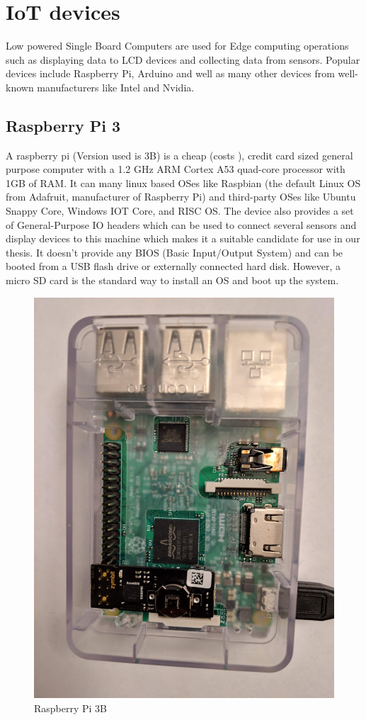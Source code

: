 \documentclass[11pt,openright]{report}
\begin{document}
\section{IoT devices}
Low powered Single Board Computers are used for Edge computing operations such as displaying data to LCD devices and collecting data from sensors. Popular devices include Raspberry Pi, Arduino and well as many other devices from well-known manufacturers like Intel and Nvidia.

\subsection{Raspberry Pi 3}
A raspberry pi (Version used is 3B) is a cheap (costs ), credit card sized general purpose computer with a 1.2 GHz ARM Cortex A53 quad-core processor with 1GB of RAM. It can many linux based OSes like Raspbian (the default Linux OS from Adafruit, manufacturer of Raspberry Pi) and third-party OSes like Ubuntu Snappy Core, Windows IOT Core, and RISC OS. The device also provides a set of General-Purpose IO headers which can be used to connect several sensors and display devices to this machine which makes it a suitable candidate for use in our thesis. It doesn't provide any BIOS (Basic Input/Output System) and can be booted from a USB flash drive or externally connected hard disk. However, a micro SD card is the standard way to install an OS and boot up the system.  

\begin{figure}
    \centering
    \includegraphics[scale=0.1]{images/rpi.jpg}
    \caption{Raspberry Pi 3B}
    \label{fig:rpi}
\end{figure}
\end{document}
